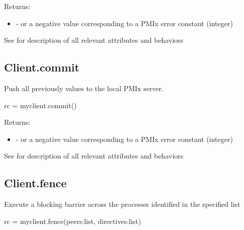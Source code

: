\begin{arglist}
\end{arglist}

Returns:

\begin{itemize}
    \item {} -  or a negative value corresponding to a PMIx error constant (integer)
\end{itemize}


See  for description of all relevant attributes and behaviors


\subsection{Client.commit}

\summary

Push all previously  values to the local PMIx server.

\format

\pyspecificstart
\begin{codepar}
rc = myclient.commit()
\end{codepar}
\pyspecificend

Returns:

\begin{itemize}
    \item {} -  or a negative value corresponding to a PMIx error constant (integer)
\end{itemize}


See  for description of all relevant attributes and behaviors


\subsection{Client.fence}

\summary

Execute a blocking barrier across the processes identified in the specified list

\format

\pyspecificstart
\begin{codepar}
rc = myclient.fence(peers:list, directives:list)
\end{codepar}
\pyspecificend

